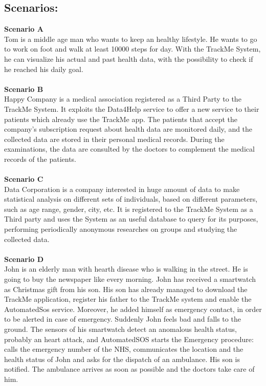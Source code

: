 \subsection{Scenarios:}
\textbf{Scenario A} \\ 
    Tom is a middle age man who wants to keep an healthy lifestyle. He wants to go to work on foot and walk at least 10000 steps for day. With the TrackMe System, he can visualize his actual and past health data, with the possibility to check if he reached his daily goal. \\ \\
\textbf{Scenario B} \\ 
    Happy Company is a medical association registered as a Third Party to the TrackMe System. It exploits the Data4Help service to offer a new service to their patients which already use the TrackMe app. The patients that accept the company's subscription request about health data are monitored daily, and the collected data are stored in their personal medical records. During the examinations, the data are consulted by the doctors to complement the medical records of the patients. \\ \\
\textbf{Scenario C} \\ 
    Data Corporation is a company interested in huge amount of data to make statistical analysis on different sets of individuals, based on different parameters, such as age range, gender, city, etc. It is registered to the TrackMe System as a Third party and uses the System as an useful database to query for its purposes, performing periodically anonymous researches on groups and studying the collected data. \\ \\
\textbf{Scenario D} \\ 
    John is an elderly man with hearth disease who is walking in the street. He is going to buy the newspaper like every morning.
    John has received a smartwatch as Christmas gift from his son. His son has already managed to download the TrackMe application, register his father to the TrackMe system and enable the AutomatedSos service. Moreover, he added himself as emergency contact, in order to be alerted in case of emergency.
    Suddenly John feels bad and falls to the ground. The sensors of his smartwatch detect an anomalous health status, probably an heart attack, and AutomatedSOS starts the Emergency procedure: calls the emergency number of the NHS, communicates the location and the health status of John and asks for the dispatch of an ambulance. His son is notified. The ambulance arrives as soon as possible and the doctors take care of him. \\ \\

